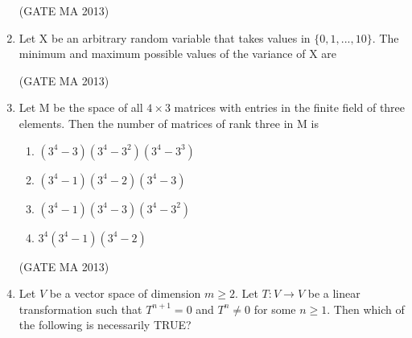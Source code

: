 \documentclass[journal,12pt,onecolumn]{IEEEtran}
\theoremstyle{remark}
\begin{document}
\begin{enumerate}
    \begin{enumerate}
    \end{enumerate}
    \hfill (GATE MA 2013)
    \item Let X be an arbitrary random variable that takes values in $\{0, 1, ..., 10\}$. The minimum and maximum possible values of the variance of X are
    \begin{enumerate}
    \end{enumerate}
    \hfill (GATE MA 2013)
    \item Let M be the space of all $4 \times 3$ matrices with entries in the finite field of three elements. Then the number of matrices of rank three in M is
    \begin{enumerate}
        \item $(3^4-3)(3^4-3^2)(3^4-3^3)$
        \item $(3^4-1)(3^4-2)(3^4-3)$
        \item $(3^4-1)(3^4-3)(3^4-3^2)$
        \item $3^4(3^4-1)(3^4-2)$
    \end{enumerate}
    \hfill (GATE MA 2013)
    \item Let $V$ be a vector space of dimension $m \ge 2$. Let $T: V \rightarrow V$ be a linear transformation such that $T^{n+1}=0$ and $T^n \neq 0$ for some $n \ge 1$. Then which of the following is necessarily TRUE?
    \begin{enumerate}
\end{enumerate}
\end{enumerate}
\end{document}
